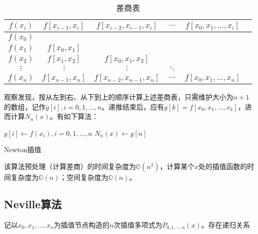 \documentclass[degree=report, output=electronic]{ustcthesis}
\begin{document}
\begin{table}[h]
  \centering
  \caption{差商表}
  \label{tab:diff-table}
  \begin{tabular}{c*{5}c}
    \toprule
    $f(x_i)$ & $f[x_{i-1},x_i]$ & $f[x_{i-2},x_{i-1},x_{i}]$ & $\cdots$ & $f[x_0,x_1,\dots,x_i]$ \\
    \midrule
    $f(x_0)$                                                                                     \\
    $f(x_1)$ & $f[x_0,x_1]$                                                                      \\
    $f(x_2)$ & $f[x_1,x_2]$     & $f[x_0,x_1,x_2]$                                               \\
    $\vdots$ & $\vdots$         & $\vdots$                   & $\ddots$                          \\ 
    $f(x_n)$ & $f[x_{n-1},x_n]$ & $f[x_{n-2},x_{n-1},x_n]$   & $\cdots$ & $f[x_0,x_1,\dots,x_n]$ \\
    \bottomrule
  \end{tabular}
\end{table}

观察发现，按从左到右、从下到上的顺序计算上述差商表，只需维护大小为$n+1$的数组，记作$g[i],i=0,1,\dots,n$。递推结束后，应有$g[k]=f[x_0,x_1,\dots,x_k]$，进而计算$N_n(x)$。有如下算法：

\begin{algorithm}[h]
  \SetAlgoLined
  
  $g[i]\leftarrow f(x_i), i=0,1,\dots,n$\;
  $N_n(x)\leftarrow g[n]$\;
  \caption{Newton插值}
  \label{algo:newton}
\end{algorithm}

该算法预处理（计算差商）的时间复杂度为$\mathbb{O}(n^2)$，计算某个$x$处的插值函数的时间复杂度为$\mathbb{O}(n)$；空间复杂度为$\mathbb{O}(n)$。

\newpage

\subsection{Neville算法}

记以$x_0,x_1,\dots,x_n$为插值节点构造的$n$次插值多项式为$P_{0,1,\cdots,n}(x)$。存在递归关系
\end{document}
